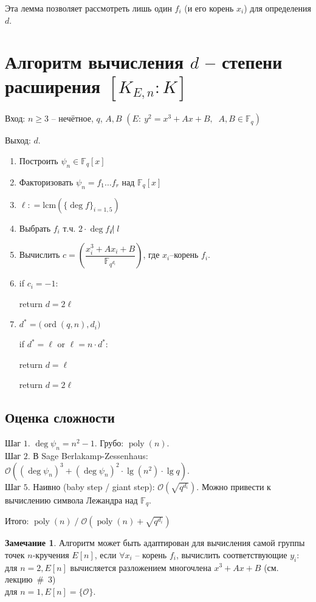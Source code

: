 \documentclass[12pt]{article}
\newcommand{\F}{{{\mathbb F}}}
\newcommand{\bigO}{\mathcal{O}}
\theoremstyle{definition}
\theoremstyle{definition}
\theoremstyle{definition}
\newtheorem{remark}[theorem]{Замечание}
\begin{document}
Эта лемма позволяет рассмотреть лишь один $f_i$ (и его корень $x_i$) для определения $d$. 

\section*{Алгоритм вычисления $d$ -- степени расширения $[{K_{E,n}}:K]$}

Вход: $n \geqslant 3$ -- нечётное, $q$, $A, B$ $( E:\:{y^2} = {x^3} + Ax + B,\;\;A,B \in \F_q )$

Выход: $d$. 

\begin{enumerate}
	\item Построить ${\psi _n} \in {\F_q}[x]$
	
	\item Факторизовать ${\psi _n} = {f_1} \ldots {f_r}$ над ${\F_q}[x]$
	
	\item $\ell: = \mathrm{lcm}( {{{\{ {\deg f}\}}_{i = 1,5}}} )$
	
	\item Выбрать ${f_i}$ т.ч. $2 \cdot \deg {f_i} \not | \; l$
	
	\item Вычислить $c = \left(\dfrac{x_i^3 + A{x_i} + B}{\F_{q^{d_i}}}\right)$, где $x_i$--корень $f_i$.
	
	\item if $c_i = - 1$:
	
	\quad return $d = 2\ell$
	
	\item ${d^*} = \mathrm( {\operatorname{ord} ( {q,n}),{d_i}})$
	
	if ${d^*} = \ell$ or $\ell = n \cdot {d^*}$:
	
	\quad return $d = \ell$
	
	return $d = 2\ell$ 
\end{enumerate}

\subsection*{Оценка сложности} 
Шаг $1$. $\deg \psi_n = n^2 - 1$. Грубо: $\operatorname{poly}(n)$. \\
Шаг $2$. В Sage Berlakamp-Zessenhaus: $\bigO( (\deg \psi_n)^3 + (\deg \psi_n)^2 \cdot \operatorname{lg}(n^2) \cdot \operatorname{lg}q  )$.\\
Шаг $5$. Наивно (baby step / giant step): $\bigO(\sqrt{q^{d_i}})$. Можно привести к вычислению символа Лежандра над $\F_q$.

Итого: $\operatorname{poly}(n) \;/\; \bigO(\operatorname{poly}(n) + \sqrt{q^{d_i}})$

\begin{remark}
	Алгоритм может быть адаптирован для вычисления самой группы точек $n$-кручения $E[ n]$, если $\forall {x_i}$ -- корень ${f_i}$, вычислить соответствующие ${y_i}$:\\
	для $n = 2, E[n]$ вычисляется разложением многочлена ${x^3} + Ax + B$ (см. лекцию~\#~3) \\
	для $n = 1, E[n] = \{ \bigO \}$. 
\end{remark}
\end{document}
